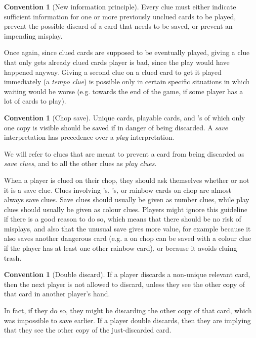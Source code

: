 \documentclass[a4paper]{article}
\theoremstyle{plain}
\theoremstyle{definition}
\newtheorem{convention}[theorem]{Convention}
\begin{document}
\begin{convention}[New information principle]
	\label{new-information}
	Every clue must either indicate sufficient information for one or more previously unclued cards to be played, prevent the possible discard of a card that needs to be saved, or prevent an impending misplay.
\end{convention}

Once again, since clued cards are supposed to be eventually played, giving a clue that only gets already clued cards player is bad, since the play would have happened anyway. Giving a second clue on a clued card to get it played immediately (a \textit{tempo clue}) is possible only in certain specific situations in which waiting would be worse (e.g. towards the end of the game, if some player has a lot of cards to play).

\begin{convention}[Chop save]
	Unique cards, playable cards, and 's of which only one copy is visible should be saved if in danger of being discarded. A \textit{save} interpretation has precedence over a \textit{play} interpretation.
\end{convention}

We will refer to clues that are meant to prevent a card from being discarded as \textit{save clues}, and to all the other clues as \textit{play clues}.

When a player is clued on their chop, they should ask themselves whether or not it is a save clue. Clues involving 's, 's, or rainbow cards on chop are almost always save clues. Save clues should usually be given as number clues, while play clues should usually be given as colour clues. Players might ignore this guideline if there is a good reason to do so, which means that there should be no risk of misplays, and also that the unusual save gives more value, for example because it also saves another dangerous card (e.g. a  on chop can be saved with a colour clue if the player has at least one other rainbow card), or because it avoids cluing trash.

\begin{convention}[Double discard]
	If a player discards a non-unique relevant card, then the next player is not allowed to discard, unless they see the other copy of that card in another player's hand.
\end{convention}

In fact, if they do so, they might be discarding the other copy of that card, which was impossible to save earlier. If a player double discards, then they are implying that they see the other copy of the just-discarded card.
\end{document}
